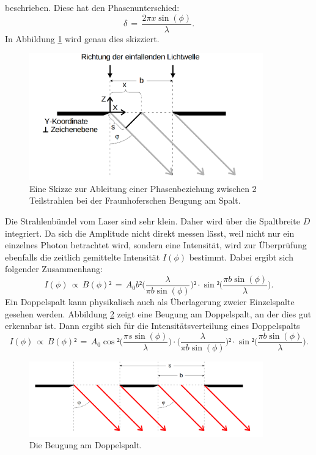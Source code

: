 \documentclass[
  bibliography=totoc,     %
  captions=tableheading,  %
  titlepage=firstiscover, %
]{scrartcl}
\begin{document}
beschrieben. Diese hat den Phasenunterschied:
\begin{equation}
  \delta\,=\,\frac{2\pi x\sin(\phi)}{\lambda}.
  \label{eqn:phasenunterschied}
\end{equation}
In Abbildung \ref{fig:V4065} wird genau dies skizziert.
\begin{figure}[htb]
  \centering
  \includegraphics[width=0.9\textwidth]{V4065.png}
  \caption{Eine Skizze zur Ableitung einer Phasenbeziehung zwischen 2 Teilstrahlen bei der Fraunhoferschen Beugung am Spalt. \cite{anleitung}}
  \label{fig:V4065}
\end{figure}
Die Strahlenbündel vom Laser sind sehr klein. Daher wird über die Spaltbreite $D$ integriert. Da sich die Amplitude nicht direkt messen lässt, weil nicht nur ein einzelnes Photon betrachtet wird, sondern eine Intensität, wird zur Überprüfung ebenfalls die zeitlich gemittelte Intensität $I(\phi)$ bestimmt. Dabei ergibt sich folgender Zusammenhang:
\begin{equation}
  I(\phi)\,\propto\,B(\phi)²\,=\,A_0 b²\Big(\frac{\lambda}{\pi b\sin(\phi)}\Big)²\cdot \sin²\Big(\frac{\pi b\sin(\phi)}{\lambda}\Big).
  \label{eqn:intensitätsverteilungeinzel}
\end{equation}
Ein Doppelspalt kann physikalisch auch als Überlagerung zweier Einzelspalte gesehen werden. Abbildung \ref{fig:V4064} zeigt eine Beugung am Doppelspalt, an der dies gut erkennbar ist. Dann ergibt sich für die Intensitätsverteilung eines Doppelspalts
\begin{equation}
  I(\phi)\,\propto\,B(\phi)²\,=\,A_0\cos²\Big(\frac{\pi s\sin(\phi)}{\lambda}\Big)\cdot\Big(\frac{\lambda}{\pi b\sin(\phi)}\Big)²\cdot \sin²\Big(\frac{\pi b\sin(\phi)}{\lambda}\Big).
  \label{eqn:intensitätsverteilungdoppel}
\end{equation}
\begin{figure}[htb]
  \centering
  \includegraphics[width=0.9\textwidth]{V4064.png}
  \caption{Die Beugung am Doppelspalt. \cite{anleitung}}
  \label{fig:V4064}
\end{figure}
\end{document}
